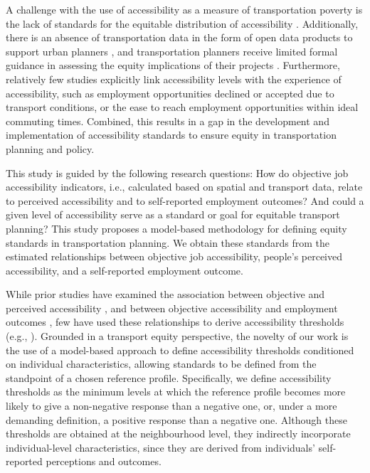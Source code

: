\documentclass[preprint, 3p,
authoryear]{elsarticle} %
\begin{document}
A challenge with the use of accessibility as a measure of transportation
poverty is the lack of standards for the equitable distribution of
accessibility \citep{soukhov2025a}. Additionally, there is an absence of
transportation data in the form of open data products to support urban
planners \citep{arribas-bel2021, behrendt_mobility_2024, páez2021}, and
transportation planners receive limited formal guidance in assessing the
equity implications of their projects
\citep{miller2018, palm2023, tebrömmelstroet2016}. Furthermore,
relatively few studies explicitly link accessibility levels with the
experience of accessibility, such as employment opportunities declined
or accepted due to transport conditions, or the ease to reach employment
opportunities within ideal commuting times. Combined, this results in a
gap in the development and implementation of accessibility standards to
ensure equity in transportation planning and policy.

This study is guided by the following research questions: How do
objective job accessibility indicators, i.e., calculated based on
spatial and transport data, relate to perceived accessibility and to
self-reported employment outcomes? And could a given level of
accessibility serve as a standard or goal for equitable transport
planning? This study proposes a model-based methodology for defining
equity standards in transportation planning. We obtain these standards
from the estimated relationships between objective job accessibility,
people's perceived accessibility, and a self-reported employment
outcome.

While prior studies have examined the association between objective and
perceived accessibility \citep{pot2021, lättman2016, zhu2025}, and
between objective accessibility and employment outcomes
\citep{bastiaanssen2021, duarte2023, jin2018, johnson2017, matas2010, kain1968, bania2008, delmelle2021, merlin2017, bastiaanssen2025},
few have used these relationships to derive accessibility thresholds
(e.g., \citet{negm2026}). Grounded in a transport equity perspective,
the novelty of our work is the use of a model-based approach to define
accessibility thresholds conditioned on individual characteristics,
allowing standards to be defined from the standpoint of a chosen
reference profile. Specifically, we define accessibility thresholds as
the minimum levels at which the reference profile becomes more likely to
give a non-negative response than a negative one, or, under a more
demanding definition, a positive response than a negative one. Although
these thresholds are obtained at the neighbourhood level, they
indirectly incorporate individual-level characteristics, since they are
derived from individuals' self-reported perceptions and outcomes.
\end{document}
